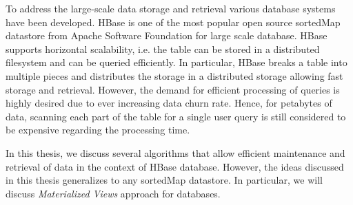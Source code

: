 \documentclass[11pt,a4paper,bibtotoc,idxtotoc,headsepline,footsepline,footexclude,BCOR12mm,DIV13]{scrbook}
\begin{document}
To address the large-scale data storage and retrieval various database systems have been developed. HBase is one of the most popular open source sortedMap datastore from Apache Software Foundation for large scale database. HBase supports horizontal scalability, i.e. the table can be stored in a distributed filesystem and can be queried  efficiently. In particular, HBase breaks a table into multiple pieces and distributes the storage in a distributed storage allowing fast storage and retrieval.  However, the demand for efficient processing of queries is highly desired due to ever increasing data churn rate. Hence, for petabytes of data, scanning each part of the table for a single user query is still considered to be expensive regarding the processing time. 

In this thesis, we discuss several algorithms that allow efficient maintenance and retrieval of data in the context of HBase database. However, the ideas discussed in this thesis generalizes to any sortedMap datastore. In particular, we will  discuss 
\emph{Materialized  Views} approach for databases.


\end{document}

